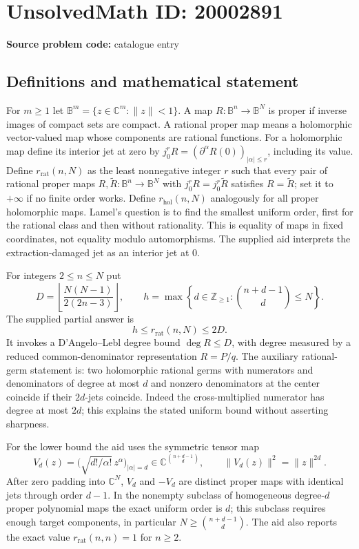 \documentclass[11pt]{article}
\newcommand{\Z}{\mathbb{Z}}
\newcommand{\C}{\mathbb{C}}
\begin{document}
\section*{UnsolvedMath ID: 20002891}
\textbf{Source problem code:} catalogue entry
\subsection{Definitions and mathematical statement}
For $m\geq1$ let $\mathbb B^m=\{z\in\C^m:\|z\|<1\}$. A map $R:\mathbb B^n\to\mathbb B^N$ is proper if inverse images of compact sets are compact. A rational proper map means a holomorphic vector-valued map whose components are rational functions. For a holomorphic map define its interior jet at zero by $j^r_0R=(\partial^\alpha R(0))_{|\alpha|\leq r}$, including its value. Define $r_{\mathrm{rat}}(n,N)$ as the least nonnegative integer $r$ such that every pair of rational proper maps $R,\widetilde R:\mathbb B^n\to\mathbb B^N$ with $j^r_0R=j^r_0\widetilde R$ satisfies $R=\widetilde R$; set it to $+\infty$ if no finite order works. Define $r_{\mathrm{hol}}(n,N)$ analogously for all proper holomorphic maps. Lamel's question is to find the smallest uniform order, first for the rational class and then without rationality. This is equality of maps in fixed coordinates, not equality modulo automorphisms. The supplied aid interprets the extraction-damaged jet as an interior jet at $0$.

For integers $2\leq n\leq N$ put
\[
D=\left\lfloor\frac{N(N-1)}{2(2n-3)}\right\rfloor,\qquad
h=\max\left\{d\in\Z_{\geq1}:\binom{n+d-1}{d}\leq N\right\}.
\]
The supplied partial answer is
\[
h\leq r_{\mathrm{rat}}(n,N)\leq2D.
\]
It invokes a D'Angelo--Lebl degree bound $\deg R\leq D$, with degree measured by a reduced common-denominator representation $R=P/q$. The auxiliary rational-germ statement is: two holomorphic rational germs with numerators and denominators of degree at most $d$ and nonzero denominators at the center coincide if their $2d$-jets coincide. Indeed the cross-multiplied numerator has degree at most $2d$; this explains the stated uniform bound without asserting sharpness.

For the lower bound the aid uses the symmetric tensor map
\[
V_d(z)=\bigl(\sqrt{d!/\alpha!}\,z^\alpha\bigr)_{|\alpha|=d}\in\C^{\binom{n+d-1}{d}},
\qquad \|V_d(z)\|^2=\|z\|^{2d}.
\]
After zero padding into $\C^N$, $V_d$ and $-V_d$ are distinct proper maps with identical jets through order $d-1$. In the nonempty subclass of homogeneous degree-$d$ proper polynomial maps the exact uniform order is $d$; this subclass requires enough target components, in particular $N\geq\binom{n+d-1}{d}$. The aid also reports the exact value $r_{\mathrm{rat}}(n,n)=1$ for $n\geq2$.
\end{document}
